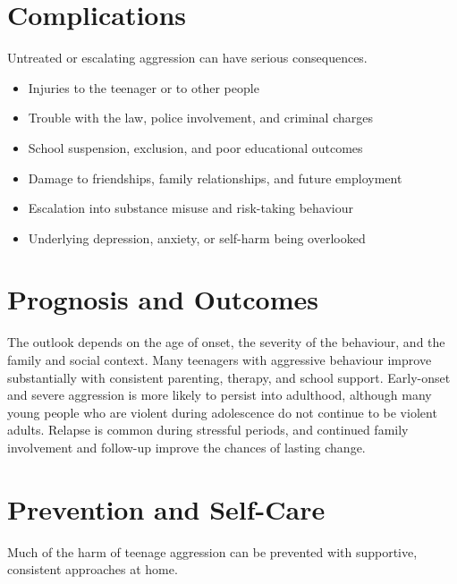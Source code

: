 \section*{Complications}
Untreated or escalating aggression can have serious consequences.

\begin{itemize}
    \item Injuries to the teenager or to other people
    \item Trouble with the law, police involvement, and criminal charges
    \item School suspension, exclusion, and poor educational outcomes
    \item Damage to friendships, family relationships, and future employment
    \item Escalation into substance misuse and risk-taking behaviour
    \item Underlying depression, anxiety, or self-harm being overlooked
\end{itemize}

\section*{Prognosis and Outcomes}
The outlook depends on the age of onset, the severity of the behaviour, and the family and social context. Many teenagers with aggressive behaviour improve substantially with consistent parenting, therapy, and school support. Early-onset and severe aggression is more likely to persist into adulthood, although many young people who are violent during adolescence do not continue to be violent adults. Relapse is common during stressful periods, and continued family involvement and follow-up improve the chances of lasting change.

\section*{Prevention and Self-Care}
Much of the harm of teenage aggression can be prevented with supportive, consistent approaches at home.

